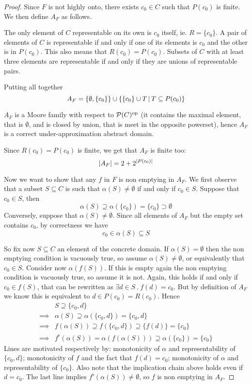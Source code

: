 \begin{proof}
	Since $F$ is not highly onto, there exists $c_0 \in C$ such that $P(c_0)$ is finite. We then define $A_F$ as follows.
	
	The only element of $C$ representable on its own is $c_0$ itself, ie. $R = \{ c_0 \}$.
	A pair of elements of $C$ is representable if and only if one of its elements is $c_0$ and the other is in $P(c_0)$. This also means that $R(c_0) = P(c_0)$.
	Subsets of $C$ with at least three elements are representable if and only if they are unions of representable pairs.

	Putting all together
	\[
	A_F = \{ \emptyset, \{ c_0 \} \} \cup \{ \{ c_0 \} \cup T \,\vert\, T \subseteq P(c_0) \}
	\]

	$A_F$ is a Moore family with respect to $\mathcal{P}(C)^{\text{op}}$ (it contains the maximal element, that is $\emptyset$, and is closed by union, that is meet in the opposite powerset), hence $A_F$ is a correct under-approximation abstract domain.

	Since $R(c_0) = P(c_0)$ is finite, we get that $A_F$ is finite too:
	\[
	\lvert A_F\rvert = 2 + 2^{\lvert P(c_0)\rvert}
	\]

	Now we want to show that any $f$ in $F$ is non emptying in $A_F$.
	We first observe that a subset $S \subseteq C$ is such that $\alpha(S) \neq \emptyset$ if and only if $c_0 \in S$. Suppose that $c_0 \in S$, then
	\[
	\alpha(S) \supseteq \alpha(\{ c_0 \}) = \{ c_0 \} \supset \emptyset
	\]
	Conversely, suppose that $\alpha(S) \neq \emptyset$. Since all elements of $A_F$ but the empty set contains $c_0$, by correctness we have
	\[
	c_0 \in \alpha(S) \subseteq S
	\]

	So fix now $S \subseteq C$ an element of the concrete domain. If $\alpha(S) = \emptyset$ then the non emptying condition is vacuously true, so assume $\alpha(S) \neq \emptyset$, or equivalently that $c_0 \in S$.
	Consider now $\alpha(f(S))$. If this is empty again the non emptying condition is vacuously true, so assume it is not. Again, this holds if and only if $c_0 \in f(S)$, that can be rewritten as $\exists d \in S\ .\ f(d) = c_0$. But by definition of $A_F$ we know this is equivalent to $d \in P(c_0) = R(c_0)$.
	Hence
	\begin{align*}
		&S \supseteq \{ c_0, d \} \\
		\implies& \alpha(S) \supseteq \alpha(\{ c_0, d \}) = \{ c_0, d \} \\
		\implies& f(\alpha(S)) \supseteq f(\{ c_0, d \}) \supseteq \{ f(d) \} = \{ c_0 \} \\
		\implies& f^{\flat}(\alpha(S)) = \alpha(f(\alpha(S))) \supseteq \alpha(\{ c_0 \}) = \{ c_0 \}
	\end{align*}
	Lines are motivated respectively by: monotonicity of $\alpha$ and representability of $\{ c_0, d \}$; monotonicity of $f$ and the fact that $f(d) = c_0$; monotonicity of $\alpha$ and representability of $\{ c_0 \}$. Also note that the implication chain above holds even if $d = c_0$.
	The last line implies $f^{\flat}(\alpha(S)) \neq \emptyset$, so $f$ is non emptying in $A_F$.
\end{proof}

